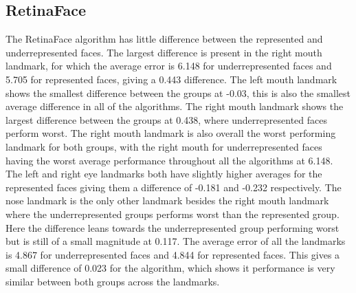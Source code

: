 \documentclass{l4proj}
\begin{document}
\subsection{RetinaFace}
The RetinaFace algorithm has little difference between the represented and underrepresented faces. The largest difference is present in the right mouth landmark, for which the average error is 6.148 for underrepresented faces and 5.705 for represented faces, giving a 0.443 difference. The left mouth landmark shows the smallest difference between the groups at -0.03, this is also the smallest average difference in all of the algorithms. The right mouth landmark shows the largest difference between the groups at 0.438, where underrepresented faces perform worst. The right mouth landmark is also overall the worst performing landmark for both groups, with the right mouth for underrepresented faces having the worst average performance throughout all the algorithms at 6.148. The left and right eye landmarks both have slightly higher averages for the represented faces giving them a difference of -0.181 and -0.232 respectively. The nose landmark is the only other landmark besides the right mouth landmark where the underrepresented groups performs worst than the represented group. Here the difference leans towards the underrepresented group performing worst but is still of a small magnitude at 0.117. The average error of all the landmarks is 4.867 for underrepresented faces and 4.844 for represented faces. This gives a small difference of 0.023 for the algorithm, which shows it performance is very similar between both groups across the landmarks. 
\end{document}
